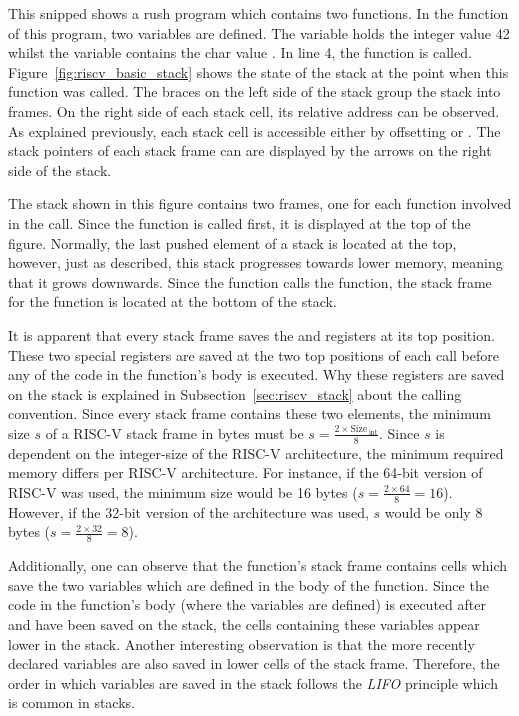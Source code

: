 This snipped shows a rush program which contains two functions.
In the  function of this program, two variables are defined.
The  variable holds the integer value 42 whilst the  variable contains the char value .
In line 4, the  function is called.
Figure~\ref{fig:riscv_basic_stack} shows the state of the stack at the point when this function was called.
The braces on the left side of the stack group the stack into frames.
On the right side of each stack cell, its relative address can be observed.
As explained previously, each stack cell is accessible either by offsetting 
or . The stack pointers of each stack frame can are displayed by the arrows on the right side of the stack.

The stack shown in this figure contains two frames, one for each function involved in the call.
Since the  function is called first, it is displayed at the top of the figure.
Normally, the last pushed element of a stack is located at the top, however, just as described,
this stack progresses towards lower memory, meaning that it grows downwards.
Since the  function calls the  function, the stack frame for the  function is located at the bottom of the stack.

It is apparent that every stack frame saves the  and  registers at its top position.
These two special registers are saved at the two top positions of each call before any of the code in the function's body is executed.
Why these registers are saved on the stack is explained in Subsection~\ref{sec:riscv_stack} about the calling convention.
Since every stack frame contains these two elements,
the minimum size $s$ of a RISC-V stack frame in bytes must be $s = \frac{2 \times \text{Size}\,_\text{int}}{8}$.
Since $s$ is dependent on the integer-size of the RISC-V architecture, the minimum required memory differs per RISC-V architecture.
For instance, if the 64-bit version of RISC-V was used, the minimum size would be 16 bytes ($s = \frac{2 \times 64}{8} = 16$).
However, if the 32-bit version of the architecture was used, $s$ would be only 8 bytes ($s = \frac{2 \times 32}{8} = 8$).

Additionally, one can observe that the  function's
stack frame contains cells which save the two variables which are defined in the body of the function.
Since the code in the function's body (where the variables are defined) is executed after  and  have been saved on the stack,
the cells containing these variables appear lower in the stack.
Another interesting observation is that the more recently declared variables are also saved in lower cells of the stack frame.
Therefore, the order in which variables are saved in the stack follows the \emph{LIFO} principle which is common in stacks.

